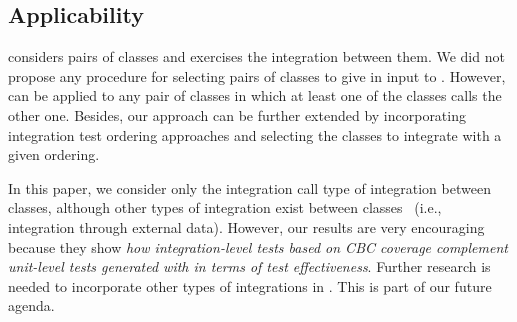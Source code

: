 



\subsection{Applicability}

\cling considers pairs of classes and exercises the integration between them. We did not propose any procedure for selecting pairs of classes to give in input to \integration. However, \cling can be applied to any pair of classes in which at least one of the classes calls the other one. Besides, our approach can be further extended by incorporating integration test ordering approaches and selecting the classes to integrate with a given ordering.

In this paper, we consider only the integration call type of integration between classes, although other types of integration exist between classes~\cite{Offutt2000b} (i.e., integration through external data). 
However, our results are very encouraging because they show \textit{how integration-level tests based on CBC coverage complement unit-level tests generated with \evosuite in terms of test effectiveness}. Further research is needed to incorporate other types of integrations in \cling. This is part of our future agenda.
